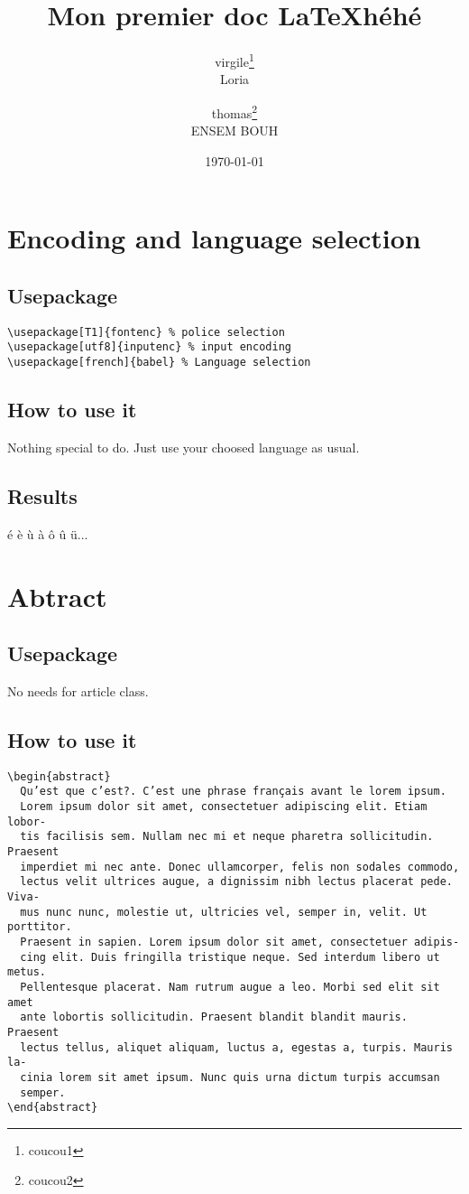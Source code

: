 \documentclass[a4paper,12pt]{article}
\begin{document}
\title{Mon premier doc \LaTeX héhé}
\author{virgile\thanks{coucou1}\\Loria \and thomas\thanks{coucou2}\\ENSEM BOUH}%
\date{\today}

\maketitle
\tableofcontents

\newpage
\section{Encoding and language selection}
\subsection{Usepackage}
\begin{verbatim}
\usepackage[T1]{fontenc} % police selection
\usepackage[utf8]{inputenc} % input encoding
\usepackage[french]{babel} % Language selection
\end{verbatim}
\subsection{How to use it}
Nothing special to do. Just use your choosed language as usual.
\subsection{Results}
é è ù à ô û ü... 
\newpage
\section{Abtract}
\subsection{Usepackage}
No needs for article class.
\subsection{How to use it}
\begin{verbatim}
\begin{abstract}
  Qu’est que c’est?. C’est une phrase français avant le lorem ipsum.
  Lorem ipsum dolor sit amet, consectetuer adipiscing elit. Etiam lobor-
  tis facilisis sem. Nullam nec mi et neque pharetra sollicitudin. Praesent
  imperdiet mi nec ante. Donec ullamcorper, felis non sodales commodo,
  lectus velit ultrices augue, a dignissim nibh lectus placerat pede. Viva-
  mus nunc nunc, molestie ut, ultricies vel, semper in, velit. Ut porttitor.
  Praesent in sapien. Lorem ipsum dolor sit amet, consectetuer adipis-
  cing elit. Duis fringilla tristique neque. Sed interdum libero ut metus.
  Pellentesque placerat. Nam rutrum augue a leo. Morbi sed elit sit amet
  ante lobortis sollicitudin. Praesent blandit blandit mauris. Praesent
  lectus tellus, aliquet aliquam, luctus a, egestas a, turpis. Mauris la-
  cinia lorem sit amet ipsum. Nunc quis urna dictum turpis accumsan
  semper.
\end{abstract}
\end{verbatim}
\end{document}
